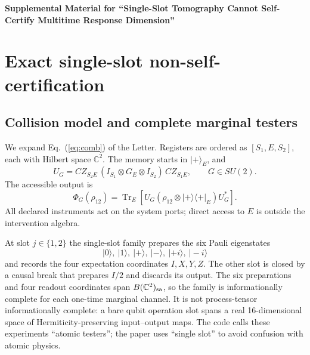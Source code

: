 \documentclass[aps,prl,reprint,superscriptaddress,nofootinbib]{revtex4-2}
\newcommand{\C}{\mathbb C}
\newcommand{\Tr}{\operatorname{Tr}}
\begin{document}
\clearpage
\onecolumngrid
\begin{center}
{\large\bfseries Supplemental Material for ``Single-Slot Tomography Cannot Self-Certify Multitime Response Dimension''}
\end{center}
\setcounter{equation}{0}
\setcounter{figure}{0}
\setcounter{table}{0}
\setcounter{section}{0}
\renewcommand{\theequation}{S\arabic{equation}}
\renewcommand{\thetable}{S\Roman{table}}
\renewcommand{\thefigure}{S\arabic{figure}}
\renewcommand{\thesection}{S\arabic{section}}


\section{Exact single-slot non-self-certification}
\label{sec:single-slot}

\subsection{Collision model and complete marginal testers}

We expand Eq.~(\ref{eq:comb}) of the Letter.  Registers are ordered as
$[S_1,E,S_2]$, each with Hilbert space $\C^2$.  The memory starts in
$|+\rangle_E$, and
\begin{equation}
 U_G=CZ_{S_2E}\,(I_{S_1}\otimes G_E\otimes I_{S_2})\,CZ_{S_1E},
 \qquad G\in SU(2).
 \label{eq:UG}
\end{equation}
The accessible output is
\begin{equation}
 \Phi_G(\rho_{12})=\Tr_E\!\left[U_G
 (\rho_{12}\otimes |+\rangle\!\langle+|_E)U_G^*\right].
 \label{eq:PhiG}
\end{equation}
All declared instruments act on the system ports; direct access to $E$ is outside the intervention algebra.

At slot $j\in\{1,2\}$ the single-slot family prepares the six Pauli eigenstates
\begin{equation}
 |0\rangle,\ |1\rangle,\ |+\rangle,\ |-\rangle,\ |+i\rangle,\ |-i\rangle
 \label{eq:sixpreps}
\end{equation}
and records the four expectation coordinates $I,X,Y,Z$.  The other slot is closed by a causal break that prepares $I/2$ and discards its output.  The six preparations and four readout coordinates span $B(\C^2)_{\rm sa}$, so the family is informationally complete for each one-time marginal channel.  It is not process-tensor informationally complete: a bare qubit operation slot spans a real 16-dimensional space of Hermiticity-preserving input--output maps.  The code calls these experiments ``atomic testers''; the paper uses ``single slot'' to avoid confusion with atomic physics.
\end{document}
